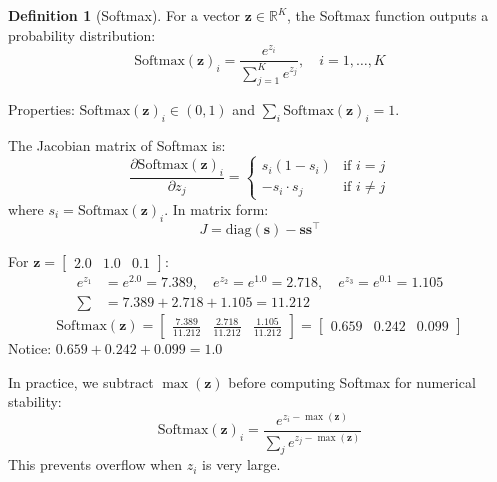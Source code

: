 \documentclass[12pt, a4paper]{report}
\theoremstyle{definition}
\newtheorem{definition}{Definition}[chapter]
\begin{document}
\begin{definition}[Softmax]
For a vector $\mathbf{z} \in \mathbb{R}^K$, the Softmax function outputs a probability distribution:
\begin{equation}
    \text{Softmax}(\mathbf{z})_i = \frac{e^{z_i}}{\sum_{j=1}^{K} e^{z_j}}, \quad i = 1, \ldots, K
\end{equation}

Properties: $\text{Softmax}(\mathbf{z})_i \in (0, 1)$ and $\sum_i \text{Softmax}(\mathbf{z})_i = 1$.
\end{definition}

The Jacobian matrix of Softmax is:
\begin{equation}
    \frac{\partial \text{Softmax}(\mathbf{z})_i}{\partial z_j} = \begin{cases}
        s_i(1 - s_i) & \text{if } i = j \\
        -s_i \cdot s_j & \text{if } i \neq j
    \end{cases}
\end{equation}
where $s_i = \text{Softmax}(\mathbf{z})_i$. In matrix form:
\begin{equation}
    J = \text{diag}(\mathbf{s}) - \mathbf{s}\mathbf{s}^\top
\end{equation}

\begin{numexample}
For $\mathbf{z} = \begin{bmatrix} 2.0 & 1.0 & 0.1 \end{bmatrix}$:
\begin{align*}
    e^{z_1} &= e^{2.0} = 7.389, \quad e^{z_2} = e^{1.0} = 2.718, \quad e^{z_3} = e^{0.1} = 1.105 \\
    \sum &= 7.389 + 2.718 + 1.105 = 11.212
\end{align*}
\[
\text{Softmax}(\mathbf{z}) = \begin{bmatrix} \frac{7.389}{11.212} & \frac{2.718}{11.212} & \frac{1.105}{11.212} \end{bmatrix} = \boxed{\begin{bmatrix} 0.659 & 0.242 & 0.099 \end{bmatrix}}
\]
Notice: $0.659 + 0.242 + 0.099 = 1.0$ \checkmark
\end{numexample}

\begin{keyidea}
In practice, we subtract $\max(\mathbf{z})$ before computing Softmax for numerical stability:
\[
\text{Softmax}(\mathbf{z})_i = \frac{e^{z_i - \max(\mathbf{z})}}{\sum_j e^{z_j - \max(\mathbf{z})}}
\]
This prevents overflow when $z_i$ is very large.
\end{keyidea}
\end{document}
